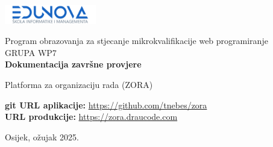 \documentclass[a4paper,12pt]{article}
\begin{document}
\begin{center}
    \includegraphics[width=0.3\textwidth]{edunova_logo.png}
\end{center}

\begin{center}
    {\Large Program obrazovanja za stjecanje mikrokvalifikacije web programiranje}\\[2ex]
    GRUPA WP7\\[2ex]
    \vspace{10em}
    {\Huge \textbf{Dokumentacija završne provjere}}\\[2ex]
\end{center}

\begin{center}
    \vspace{2em}
    {\Large {Platforma za organizaciju rada (ZORA)}}\\[2ex]
\end{center}

\begin{center}
    \vspace{2em}
    \noindent\textbf{git URL aplikacije:} \url{https://github.com/tnebes/zora}\\[1ex]
    \textbf{URL produkcije:} \url{https://zora.draucode.com}
\end{center}

\vspace{2cm}

\begin{center}
\end{center}

\vfill
\begin{center}
    {\large Osijek, ožujak 2025.}
\end{center}

\newpage

\tableofcontents
\newpage


\newpage

\newpage

\newpage

\newpage

\newpage

\newpage

\newpage

\end{document}

